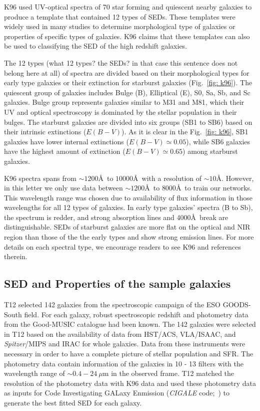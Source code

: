     K96 used UV-optical spectra of 70 star forming and quiescent nearby galaxies to produce a template that contained 12 types of SEDs.
    These templates were widely used in many studies to determine morphological type of galaxies or properties of specific types of galaxies\citep[e.g.][]{Shakouri16,Paiano16,Laporte16,Holden16}.
    K96 claims that these templates can also be used to classifying the SED of the high redshift galaxies. 
    
    The 12 types (what 12 types? the SEDs? in that case this sentence does not belong here at all) of spectra are divided based on their morphological types for early type galaxies or their extinction for starburst galaxies (Fig.~\ref{fig: k96}). 
    The quiescent group of galaxies includes Bulge (B), Elliptical (E), S0, Sa, Sb, and Sc galaxies.
    Bulge group represents galaxies similar to M31 and M81, which their UV and optical spectroscopy is dominated by the stellar population in their bulges.
    The starburst galaxies are divided into six groups (SB1 to SB6) based on their intrinsic extinctions ($E(B-V)$). 
    As it is clear in the Fig.~\ref{fig: k96}, SB1 galaxies have lower internal extinctions ($E(B-V) \simeq 0.05$), while SB6 galaxies have the highest amount of extinction ($E(B-V) \simeq 0.65$) among starburst galaxies. 
    
    K96 spectra spans from $\sim1200$\AA~to $10000$\AA~with a resolution of $\sim 10$\AA.
    However, in this letter we only use data between $\sim1200$\AA ~to $8000$\AA~to train our networks. 
    This wavelength range was chosen due to availability of flux information in those wavelengths for all 12 types of galaxies.
    In early type galaxies' spectra (B to Sb), the spectrum is redder, and strong absorption lines and 4000\AA~break are distinguishable.
    SEDs of starburst galaxies are more flat on the optical and NIR region than those of the the early types and show strong emission lines.
    For more details on each spectral type, we encourage readers to see K96 and references therein. 
    

 \subsection{SED and Properties of the sample galaxies} 
    T12 selected 142 galaxies from the spectroscopic campaign of the ESO GOODS-South field.
    For each galaxy, robust spectroscopic redshift and photometry data from the Good-MUSIC catalogue had been known.
    The 142 galaxies were selected in T12 based on the availability of data from HST/ACS, VLA/ISAAC, and {\it Spitzer}/MIPS and IRAC for whole galaxies. 
    Data from these instruments were necessary in order to have a complete picture of stellar population and SFR.
    The photometry data contain information of the galaxies in 10 - 13 filters with the wavelength range of $\sim 0.4-24~\mu$m in the observed frame.
    T12 matched the resolution of the photometry data with K96 data and used these photometry data as inputs for Code Investigating GALaxy Enmission ({\em CIGALE} code;~\citep[][hereafter N09]{Noll09}) to generate the best fitted SED for each galaxy.%
    
